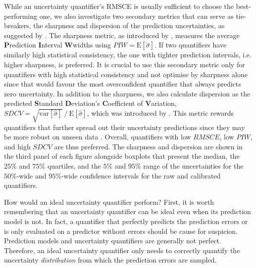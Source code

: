 While an uncertainty quantifier's RMSCE is usually sufficient to choose the best-performing one, we also investigate two secondary metrics that can serve as tie-breakers, the sharpness and dispersion of the prediction uncertainties, as suggested by \textcite{uncertainty-metrics-2023}. The sharpness metric, as introduced by \textcite{uncertainty-sharpness-2007}, measures the average \textbf{P}rediction \textbf{I}nterval \textbf{W}widths using $PIW = \text{E}[\hat{\sigma}]$. If two quantifiers have similarly high statistical consistency, the one with tighter prediction intervals, i.e. higher sharpness, is preferred. It is crucial to use this secondary metric only for quantifiers with high statistical consistency and not optimise by sharpness alone since that would favour the most overconfident quantifier that always predicts zero uncertainty. In addition to the sharpness, we also calculate dispersion as the predicted \textbf{S}tandard \textbf{D}eviation's \textbf{C}oefficient of \textbf{V}ariation, $SDCV = \sqrt{\text{var}[\hat{\sigma}]} \mathbin{/} \text{E}[\hat{\sigma}]$, which was introduced by \textcite{uncertainty-dispersion-2019}. This metric rewards quantifiers that further spread out their uncertainty predictions since they may be more robust on unseen data \cite{uncertainty-metrics-2023}. Overall, quantifiers with low $RMSCE$, low $PIW$, and high $SDCV$ are thus preferred. The sharpness and dispersion are shown in the third panel of each figure alongside boxplots that present the median, the $25\%$ and $75\%$ quartiles, and the $5\%$ and $95\%$ range of the uncertainties for the $50\%$-wide and $95\%$-wide confidence intervals for the raw and calibrated quantifiers.

\newpar How would an ideal uncertainty quantifier perform? First, it is worth remembering that an uncertainty quantifier can be ideal even when its prediction model is not. In fact, a quantifier that perfectly predicts the prediction errors or is only evaluated on a predictor without errors should be cause for suspicion. Prediction models and uncertainty quantifiers are generally not perfect. Therefore, an ideal uncertainty quantifier only needs to correctly quantify the uncertainty \textit{distribution} from which the prediction errors are sampled.

